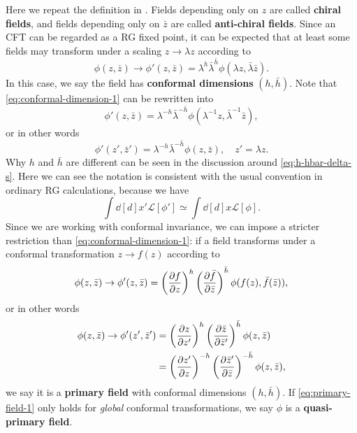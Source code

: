 \documentclass[hyperref, a4paper]{article}
\newcommand*{\concept}[1]{{\textbf{#1}}}
\begin{document}
Here we repeat the definition in \cite{blumenhagen2009introduction}. 
Fields depending only on $z$ are called \concept{chiral fields}, and fields depending only on $\bar{z}$ are 
called \concept{anti-chiral fields}. Since an CFT can be regarded as a RG fixed point, it can be expected that 
at least some fields may transform under a scaling $z \to \lambda z$ according to 
\begin{equation}
    \phi(z, \bar{z}) \to \phi'(z, \bar{z}) = \lambda^h \bar{\lambda}^{\bar{h}} \phi(\lambda z, \bar{\lambda} \bar{z}).
    \label{eq:conformal-dimension-1}
\end{equation}
In this case, we say the field has \concept{conformal dimensions} $(h, \bar{h})$. Note that \eqref{eq:conformal-dimension-1} can be rewritten into 
\[
    \phi'(z, \bar{z}) = \lambda^{-h} \bar{\lambda}^{-\bar{h}} \phi(\lambda^{-1} z, \bar{\lambda}^{-1} \bar{z}),
\]
or in other words
\begin{equation}
    \phi'(z', \bar{z}') = \lambda^{-h} \bar{\lambda}^{- \bar{h}} \phi(z, \bar{z}) , \quad z' = \lambda z.
    \label{eq:conformal-dimension-2}
\end{equation}
Why $h$ and $\bar{h}$ are different can be seen in the discussion around \eqref{eq:h-hbar-delta-s}.
Here we can see the notation is consistent with the usual convention in ordinary RG calculations, because we have 
\[
    \int \dd[d]{x'} \mathcal{L}[\phi'] \simeq \int \dd[d]{x} \mathcal{L}[\phi].
\]
Since we are working with conformal invariance, we can impose a stricter restriction than 
\eqref{eq:conformal-dimension-1}: if a field transforms under a conformal transformation $z \to f(z)$
according to 
\begin{equation}
    \phi(z, \bar{z}) \to \phi'(z, \bar{z}) = \left(\pdv{f}{z}\right)^{h} \left(\pdv{\bar{f}}{\bar{z}}\right)^{\bar{h}} \phi(f(z), \bar{f}(\bar{z})),
    \label{eq:primary-field-1}
\end{equation}
or in other words 
\begin{equation}
    \begin{aligned}
        \phi(z, \bar{z}) \to \phi'(z', \bar{z}') &= \left(\pdv{z}{z'}\right)^{h} \left(\pdv{\bar{z}}{\bar{z}'}\right)^{\bar{h}} \phi(z, \bar{z}) \\
        &= \left(\pdv{z'}{z}\right)^{- h} \left(\pdv{\bar{z}'}{\bar{z}}\right)^{- \bar{h}} \phi(z, \bar{z}) ,
    \end{aligned}
    \label{eq:primary-field-def}
\end{equation}
we say it is a \concept{primary field} with conformal dimensions $(h, \bar{h})$. If \eqref{eq:primary-field-1}
only holds for \emph{global} conformal transformations, we say $\phi$ is a \concept{quasi-primary field}.
\end{document}
